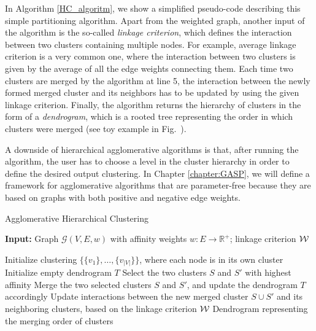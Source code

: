 In Algorithm \ref{HC_algoritm}, we show a simplified pseudo-code describing this simple partitioning algorithm. Apart from the weighted graph, another input of the algorithm is the so-called \emph{linkage criterion}, which defines the interaction between two clusters containing multiple nodes. For example, average linkage criterion is a very common one, where the interaction between two clusters is given by the average of all the edge weights connecting them. Each time two clusters are merged by the algorithm at line 5, the interaction between the newly formed merged cluster and its neighbors has to be updated by using the given linkage criterion. 
Finally, the algorithm returns the hierarchy of clusters in the form of a \emph{dendrogram}, which is a rooted tree representing the order in which clusters were merged (see toy example in Fig.~). 

A downside of hierarchical agglomerative algorithms is that, after running the algorithm, the user has to choose a level in the cluster hierarchy in order to define the desired output clustering. 
In Chapter \ref{chapter:GASP}, we will define a framework for agglomerative algorithms that are parameter-free because they are based on graphs with both positive and negative edge weights.

\begin{algorithm}[t]
\footnotesize
  \begin{flushleft}
  \footnotesize
  \caption{Agglomerative Hierarchical Clustering}
   \hspace*{\algorithmicindent} \textbf{Input:} Graph $\mathcal{G}(V,E,w)$ with affinity weights $w:E \rightarrow \mathbb{R}^+$; linkage criterion $\mathcal{W}{}$ \\
  \begin{algorithmic}[1]
  \footnotesize
      \State Initialize clustering $\{\{v_1\}, \ldots, \{v_{|V|}\}\}$, where each node is in its own cluster
      \State Initialize empty dendrogram $T$
      \Repeat 
        \State Select the two clusters $S$ and $S'$ with highest affinity
        \State Merge the two selected clusters $S$ and $S'$, and update the dendrogram $T$ accordingly
        \State Update interactions between the new merged cluster $S \cup S'$ and its neighboring clusters, based on the linkage criterion $\mathcal{W}{}$
      \State
      \Return Dendrogram representing the merging order of clusters
  \end{algorithmic}
    \label{HC_algoritm}
  \end{flushleft}

\end{algorithm}


